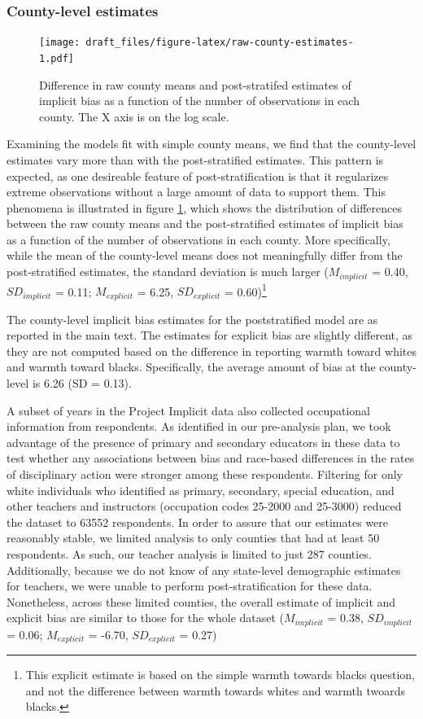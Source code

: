 \documentclass[english,floatsintext,man]{apa6}
\theoremstyle{definition}
\theoremstyle{definition}
\theoremstyle{remark}
\begin{document}
\subsubsection{County-level estimates}\label{county-level-estimates}

\begin{figure}
\centering
\texttt{[image: draft\_files/figure-latex/raw-county-estimates-1.pdf]}
\caption{\label{fig:raw-county-estimates}Difference in raw county means and
post-stratifed estimates of implicit bias as a function of the number of
observations in each county. The X axis is on the log scale.}
\end{figure}

Examining the models fit with simple county means, we find that the
county-level estimates vary more than with the post-stratified
estimates. This pattern is expected, as one desireable feature of
post-stratification is that it regularizes extreme observations without
a large amount of data to support them. This phenomena is illustrated in
figure \ref{fig:raw-county-estimates}, which shows the distribution of
differences between the raw county means and the post-stratified
estimates of implicit bias as a function of the number of observations
in each county. More specifically, while the mean of the county-level
means does not meaningfully differ from the post-stratified estimates,
the standard deviation is much larger (\(M_{implicit}\) = 0.40,
\(SD_{implicit}\) = 0.11; \(M_{explicit}\) = 6.25, \(SD_{explicit}\) =
0.60)\footnote{This explicit estimate is based on the simple warmth
  towards blacks question, and not the difference between warmth towards
  whites and warmth twoards blacks.}

The county-level implicit bias estimates for the poststratified model
are as reported in the main text. The estimates for explicit bias are
slightly different, as they are not computed based on the difference in
reporting warmth toward whites and warmth toward blacks. Specifically,
the average amount of bias at the county-level is 6.26 (SD = 0.13).

A subset of years in the Project Implicit data also collected
occupational information from respondents. As identified in our
pre-analysis plan, we took advantage of the presence of primary and
secondary educators in these data to test whether any associations
between bias and race-based differences in the rates of disciplinary
action were stronger among these respondents. Filtering for only white
individuals who identified as primary, secondary, special education, and
other teachers and instructors (occupation codes 25-2000 and 25-3000)
reduced the dataset to 63552 respondents. In order to assure that our
estimates were reasonably stable, we limited analysis to only counties
that had at least 50 respondents. As such, our teacher analysis is
limited to just 287 counties. Additionally, because we do not know of
any state-level demographic estimates for teachers, we were unable to
perform post-stratification for these data. Nonetheless, across these
limited counties, the overall estimate of implicit and explicit bias are
similar to those for the whole dataset (\(M_{implicit}\) = 0.38,
\(SD_{implicit}\) = 0.06; \(M_{explicit}\) = -6.70, \(SD_{explicit}\) =
0.27)
\end{document}
